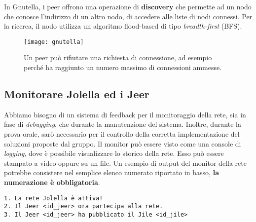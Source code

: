 In Gnutella, i peer offrono una operazione di \textbf{discovery} che permette ad
un nodo che conosce l'indirizzo di un altro nodo, di accedere alle liste di nodi
connessi. Per la ricerca, il  nodo utilizza un algoritmo flood-based di tipo
\textit{breadth-first} (BFS).

\begin{figure}[H]
 \centering
 \texttt{[image: gnutella]}
 \caption{Un peer può rifiutare una richiesta di connessione, ad esempio perché ha raggiunto un numero massimo di connessioni ammesse.}
\end{figure}

\subsection{Monitorare Jolella ed i Jeer}

Abbiamo bisogno di un sistema di feedback per il monitoraggio della rete, sia in
fase di \textit{debugging}, che durante la manutenzione del sistema. Inoltre,
durante la prova orale, sarò necessario per il controllo della corretta
implementazione del soluzioni proposte dal gruppo. Il monitor può essere visto
come una console di \textit{logging}, dove è possibile visualizzare lo storico
della rete. Esso può essere stampato a video oppure su un file. Un esempio di
output del monitor della rete potrebbe consistere nel semplice elenco numerato
riportato in basso, \textbf{la numerazione è obbligatoria}.

\begin{verbatim}
1. La rete Jolella è attiva!
2. Il Jeer <id_jeer> ora partecipa alla rete.
3. Il Jeer <id_jeer> ha pubblicato il Jile <id_jile>
\end{verbatim}
